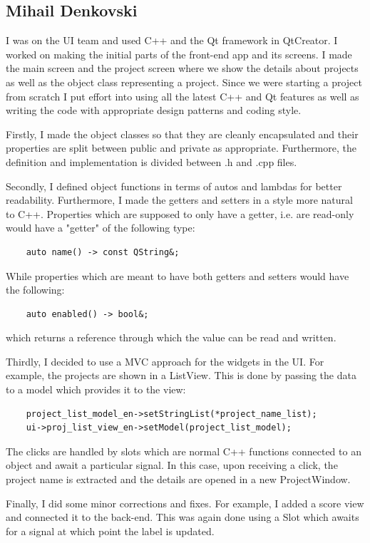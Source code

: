 \documentclass{article}
\begin{document}
\subsection{Mihail Denkovski}
I was on the UI team and used C++ and the Qt framework in QtCreator. I worked on making the initial parts of the front-end app and its screens. I made the main screen and the project screen where we show the details about projects as well as the object class representing a project. Since we were starting a project from scratch I put effort into using all the latest C++ and Qt features as well as writing the code with appropriate design patterns and coding style. 

Firstly, I made the object classes so that they are cleanly encapsulated and their properties are split between public and private as appropriate. Furthermore, the definition and implementation is divided between .h and .cpp files. 

Secondly, I defined object functions in terms of autos and lambdas for better readability. Furthermore, I made the getters and setters in a style more natural to C++. Properties which are supposed to only have a getter, i.e. are read-only would have a "getter" of the following type:
\begin{verbatim}
    auto name() -> const QString&;
\end{verbatim}
While properties which are meant to have both getters and setters would have the following:
\begin{verbatim}
    auto enabled() -> bool&;
\end{verbatim}
which returns a reference through which the value can be read and written.

Thirdly, I decided to use a MVC approach for the widgets in the UI. For example, the projects are shown in a ListView. This is done by passing the data to a model which provides it to the view:
\begin{verbatim}
    project_list_model_en->setStringList(*project_name_list);
    ui->proj_list_view_en->setModel(project_list_model);    
\end{verbatim}
The clicks are handled by slots which are normal C++ functions connected to an object and await a particular signal. In this case, upon receiving a click, the project name is extracted and the details are opened in a new ProjectWindow.

Finally, I did some minor corrections and fixes. For example, I added a score view and connected it to the back-end. This was again done using a Slot which awaits for a signal at which point the label is updated.
\end{document}
